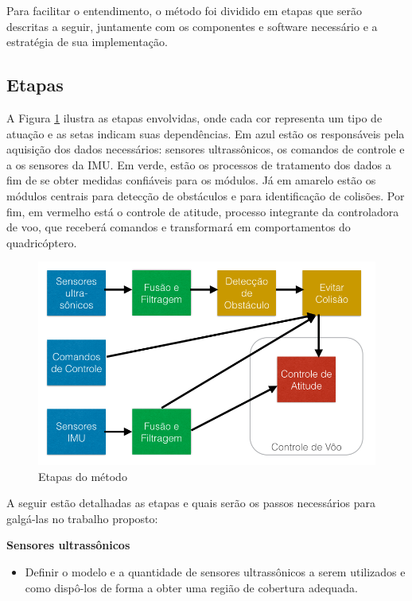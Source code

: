 \documentclass[a4paper, 12pt]{article}
\begin{document}
Para facilitar o entendimento, o método foi dividido em etapas que serão  descritas a seguir, juntamente com os componentes e software necessário e a estratégia de sua implementação.

\subsection{Etapas}

\label{subsec:etapas}

A Figura \ref{fig:etapasMetodo} ilustra as etapas envolvidas, onde cada cor representa um tipo de atuação e as setas indicam suas dependências. Em azul estão os responsáveis pela aquisição dos dados necessários: sensores ultrassônicos, os comandos de controle e a os sensores da IMU. Em verde, estão os processos de tratamento dos dados a fim de se obter medidas confiáveis para os módulos. Já em amarelo estão os módulos centrais para detecção de obstáculos e para identificação de colisões. Por fim, em vermelho está o controle de atitude, processo integrante da controladora de voo, que receberá comandos e transformará em comportamentos do quadricóptero.   

\begin{figure}[h]
	\centering
	\includegraphics[scale=0.4]{img/etapasMetodo.png}
	\caption{Etapas do método}
	\label{fig:etapasMetodo}
\end{figure}

A seguir estão detalhadas as etapas e quais serão os passos necessários para galgá-las no trabalho proposto:

\noindent\textbf{Sensores ultrassônicos} 
\begin{itemize}
	\item
	Definir o modelo e a quantidade de sensores ultrassônicos a serem utilizados e como dispô-los de forma a obter uma região de cobertura adequada.  
\end{itemize}
\end{document}
